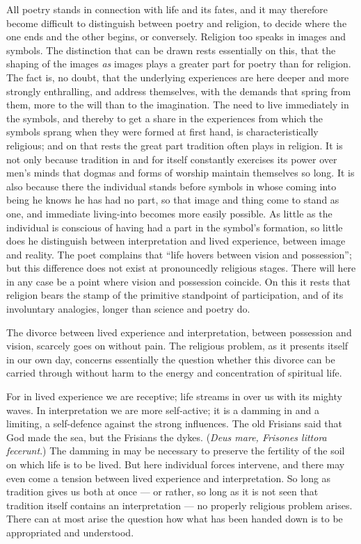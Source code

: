 \documentclass[12pt]{book}
\newcommand{\opage}[1]{\marginnote{\footnotesize\textit{[#1]}}}
\begin{document}
All poetry stands in connection with life and its fates, and it may therefore
become difficult to distinguish between poetry and religion, to decide where the
one ends and the other begins, or conversely. Religion too speaks in images and
symbols. The distinction that can be drawn rests essentially on this, that the
shaping of the images \textit{as} images plays a greater part for poetry than for
religion. The fact is, no doubt, that the underlying experiences are here deeper
and more strongly enthralling, and address themselves, with the demands that spring
from them, more to the will than to the imagination. The need to live immediately
in the symbols, and thereby to get a share in the experiences from which the
symbols sprang when they were formed at first hand, is characteristically
religious; and on that rests the great part tradition often plays in religion. It
is not only because tradition in and for itself constantly exercises its power over
men's minds that dogmas and forms of worship maintain themselves so long. It is
also because there the individual stands before symbols in whose coming into being
he knows he has had no part, so that image and thing come to stand as one, and
immediate living-into becomes more easily possible. As little as the individual is
conscious of having had a part in the symbol's formation, so little does he
distinguish between interpretation and lived experience, between image and reality.
The poet complains that ``life hovers between vision and possession''; but this
difference does not exist at pronouncedly religious stages. There will here in any
case be a point where vision and possession coincide. On this it rests that
religion bears the stamp of the primitive standpoint of participation, and of its
involuntary analogies, longer than science and poetry do.

\opage{133}The divorce between lived experience and interpretation, between possession and
vision, scarcely goes on without pain. The religious problem, as it presents itself
in our own day, concerns essentially the question whether this divorce can be
carried through without harm to the energy and concentration of spiritual life.

For in lived experience we are receptive; life streams in over us with its mighty
waves. In interpretation we are more self-active; it is a damming in and a
limiting, a self-defence against the strong influences. The old Frisians said that
God made the sea, but the Frisians the dykes. (\textit{Deus mare, Frisones littora
fecerunt}.) The damming in may be necessary to preserve the fertility of the soil
on which life is to be lived. But here individual forces intervene, and there may
even come a tension between lived experience and interpretation. So long as
tradition gives us both at once --- or rather, so long as it is not seen that
tradition itself contains an interpretation --- no properly religious problem arises.
There can at most arise the question how what has been handed down is to be
appropriated and understood.
\end{document}
